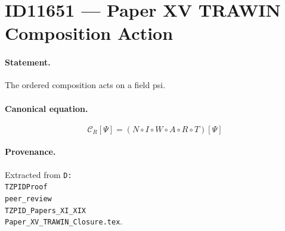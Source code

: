 \section*{ID11651 --- Paper XV TRAWIN Composition Action}

\paragraph{Statement.}
The ordered composition acts on a field psi.

\paragraph{Canonical equation.}
\[
\mathcal{C}_R[\Psi]=(N\circ I\circ W\circ A\circ R\circ T)[\Psi]
\]

\paragraph{Provenance.}
Extracted from \texttt{D:\\TZPIDProof\\peer\_review\\TZPID\_Papers\_XI\_XIX\\Paper\_XV\_TRAWIN\_Closure.tex}.
